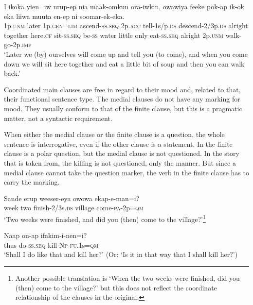 \ea%
\label{ex:8:x1442}
\gll I  ikoka  yien=iw  urup-ep  nia  maak-omkun ora-iwkin,    owawiya  feeke  pok-ap  ik-ok  eka liiwa  muuta  en-ep    ni  soomar-ek-eka.\\
1p.\textsc{unm} later 1p.\textsc{gen}=\textsc{lim} ascend-\textsc{ss}.\textsc{seq} 2p.\textsc{acc} tell-1s/p.\textsc{ds} descend-2/3p.\textsc{ds} alright together here.\textsc{cf} sit-\textsc{ss}.\textsc{seq} be-\textsc{ss} water little  only  eat-\textsc{ss}.\textsc{seq} alright  2p.\textsc{unm} walk-go-2p.\textsc{imp}\\
\glt`Later we (by) ourselves will come up and tell you (to come), and when you come down we will sit here together and eat a little bit of soup and then you can walk back.'
\z


Coordinated main clauses are free in regard to their mood and, related to that, their functional sentence type. The medial clauses do not have any marking for mood.  They usually conform to that of the finite clause, but this is a pragmatic matter, not a syntactic requirement. 

When either the medial clause or the finite clause is a question, the whole sentence is interrogative, even if the other clause is a statement. In  the finite clause is a polar question, but the medial clause is not questioned. In the story that  is taken from, the killing is not questioned, only the manner. But since a medial clause cannot take the question marker, the verb in the finite clause has to carry the marking.

\ea%
\label{ex:8:x1449}
\gll Sande  erup  weeser-eya  owowa  ekap-e-man=i? \\
week  two  finish-2/3s.\textsc{ds} village  come-\textsc{pa}-2p=\textsc{qm}\\
\glt`Two weeks were finished, and did you (then) come to the village?'\footnote{Another possible translation is `When the two weeks were finished, did you (then) come to the village?' but this does not reflect the coordinate relationship of the clauses in the original.}
\z


\ea%
\label{ex:8:x1452}
\gll Naap  on-ap  ifakim-i-nen=i?\\
thus do-\textsc{ss}.\textsc{seq} kill-\textsc{Np}-\textsc{fu}.1s=\textsc{qm}\\
\glt`Shall I do like that and kill her?' (Or: `Is it in that way that I shall kill her?')
\z


